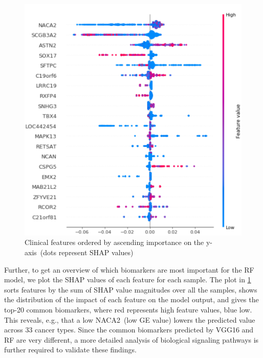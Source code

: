 \begin{figure}[h]
\centering
	\includegraphics[scale=0.8]{images/fi.png}
	\caption[Clinical features ordered by ascending importance]{Clinical features ordered by ascending importance on the y-axis~(dots represent SHAP values)} 
	\label{fig:shap_FI}
	\vspace{-2mm}
\end{figure}

\hspace*{3.5mm} Further, to get an overview of which biomarkers are most important for the RF model, we plot the SHAP values of each feature for each sample. The plot in \cref{fig:shap_FI} sorts features by the sum of SHAP value magnitudes over all the samples, shows the distribution of the impact of each feature on the model output, and gives the top-20 common biomarkers, where red represents high feature values, blue low. This reveals, e.g., that a low NACA2~(low GE value) lowers the predicted value across 33 cancer types. Since the common biomarkers predicted by VGG16 and RF are very different, a more detailed analysis of biological signaling pathways is further required to validate these findings. 

